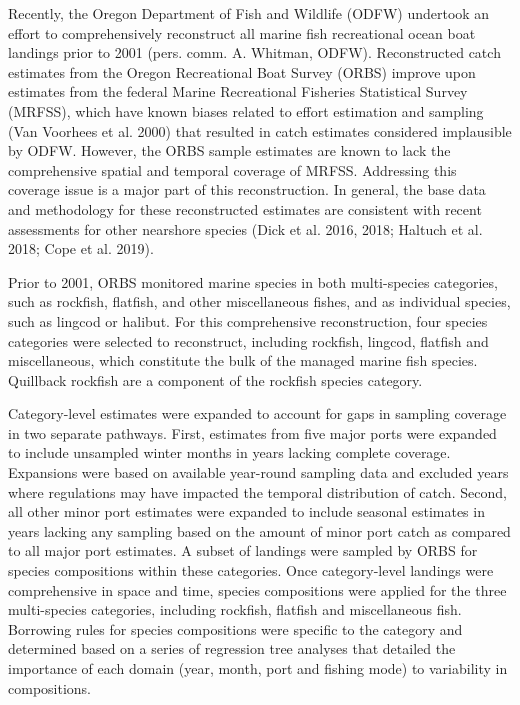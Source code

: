 \documentclass[11pt,
  english,
  a4paper,
]{article}
\begin{document}
Recently, the Oregon Department of Fish and Wildlife (ODFW) undertook an effort to comprehensively reconstruct all marine fish recreational ocean boat landings prior to 2001 (pers. comm. A. Whitman, ODFW). Reconstructed catch estimates from the Oregon Recreational Boat Survey (ORBS) improve upon estimates from the federal Marine Recreational Fisheries Statistical Survey (MRFSS), which have known biases related to effort estimation and sampling {(Van Voorhees et al. 2000)\leavevmode\tagmcend\tagstructend} that resulted in catch estimates considered implausible by ODFW. However, the ORBS sample estimates are known to lack the comprehensive spatial and temporal coverage of MRFSS. Addressing this coverage issue is a major part of this reconstruction. In general, the base data and methodology for these reconstructed estimates are consistent with recent assessments for other nearshore species {(Dick et al. 2016, 2018; Haltuch et al. 2018; Cope et al. 2019)\leavevmode\tagmcend\tagstructend}.

\leavevmode\tagmcend\tagstructend\par


Prior to 2001, ORBS monitored marine species in both multi-species categories, such as rockfish, flatfish, and other miscellaneous fishes, and as individual species, such as lingcod or halibut. For this comprehensive reconstruction, four species categories were selected to reconstruct, including rockfish, lingcod, flatfish and miscellaneous, which constitute the bulk of the managed marine fish species. Quillback rockfish are a component of the rockfish species category.

\leavevmode\tagmcend\tagstructend\par


Category-level estimates were expanded to account for gaps in sampling coverage in two separate pathways. First, estimates from five major ports were expanded to include unsampled winter months in years lacking complete coverage. Expansions were based on available year-round sampling data and excluded years where regulations may have impacted the temporal distribution of catch. Second, all other minor port estimates were expanded to include seasonal estimates in years lacking any sampling based on the amount of minor port catch as compared to all major port estimates. A subset of landings were sampled by ORBS for species compositions within these categories. Once category-level landings were comprehensive in space and time, species compositions were applied for the three multi-species categories, including rockfish, flatfish and miscellaneous fish. Borrowing rules for species compositions were specific to the category and determined based on a series of regression tree analyses that detailed the importance of each domain (year, month, port and fishing mode) to variability in compositions.
\end{document}
